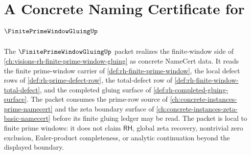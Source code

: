 \chapter{A Concrete Naming Certificate for $\FinitePrimeWindowGluingUp$}
\label{ch:concrete-instances-finite-prime-window-gluing-namecert}

The $\FinitePrimeWindowGluingUp$ packet realizes the finite-window side of \autoref{ch:visions-rh-finite-prime-window-gluing} as concrete NameCert data. It reads the finite prime-window carrier of \autoref{def:rh-finite-prime-window}, the local defect rows of \autoref{def:rh-prime-defect-row}, the total-defect row of \autoref{def:rh-finite-window-total-defect}, and the completed gluing surface of \autoref{def:rh-completed-gluing-surface}. The packet consumes the prime-row source of \autoref{ch:concrete-instances-prime-namecert} and the zeta boundary surface of \autoref{ch:concrete-instances-zeta-basic-namecert} before its finite gluing ledger may be read. The packet is local to finite prime windows: it does not claim $\mathsf{RH}$, global zeta recovery, nontrivial zero exclusion, Euler-product completeness, or analytic continuation beyond the displayed boundary.

